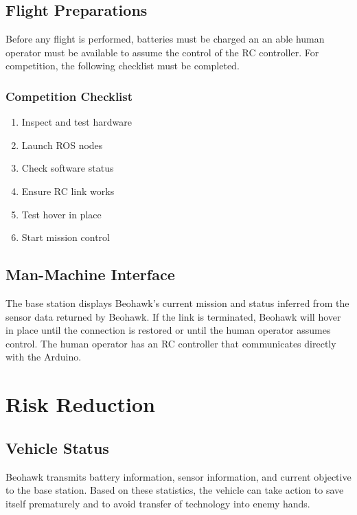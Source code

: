\documentclass[12pt, letterpaper]{article}
\begin{document}
\subsection{Flight Preparations}
Before any flight is performed, batteries must be charged an an able human operator must be available to assume the control of the RC controller.  For competition, the following checklist must be completed.

\subsubsection{Competition Checklist}
\begin{enumerate}
  \item Inspect and test hardware
  \item Launch ROS nodes
  \item Check software status
  \item Ensure RC link works
  \item Test hover in place
  \item Start mission control
\end{enumerate}

\subsection{Man-Machine Interface}
The base station displays Beohawk's current mission and status inferred from the sensor data returned by Beohawk.  If the link is terminated, Beohawk will  hover in place until the connection is restored or until the human operator assumes control. The human operator has an RC controller that communicates directly with the Arduino.


\section{Risk Reduction}
\subsection{Vehicle Status}
Beohawk transmits battery information, sensor information, and current objective to the base station. Based on these statistics, the vehicle can take action to save itself prematurely and to avoid transfer of technology into enemy hands. 
\end{document}
